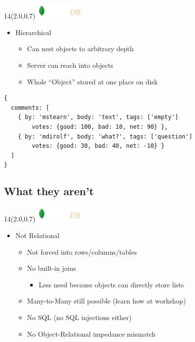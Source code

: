 \documentclass{beamer}
\newcommand{\MongoLogo}{
\begin{textblock}{14}(2.0,0.7)
  \includegraphics[height=0.8cm]{logo-mongodb-ondark.png}
\end{textblock}
}
\begin{document}
\begin{frame}[fragile]
  \MongoLogo
  \begin{itemize}
    \item Hierarchical 
    \begin{itemize}
      \item Can nest objects to arbitrary depth
      \item Server can reach into objects
      \item Whole ``Object'' stored at one place on disk
    \end{itemize}
  \end{itemize}

  \small
  \begin{lstlisting}
{
  comments: [
    { by: 'mstearn', body: 'text', tags: ['empty']
        votes: {good: 100, bad: 10, net: 90} },
    { by: 'mdirolf', body: 'what?', tags: ['question']
        votes: {good: 30, bad: 40, net: -10} }
  ]
}
  \end{lstlisting}
\end{frame}

\subsection{What they aren't}
\begin{frame}
  \MongoLogo

  \begin{itemize}
    \item Not Relational
    \begin{itemize}
      \item Not forced into rows/columns/tables
      \item No built-in joins
        \begin{itemize}
          \item Less need because objects can directly store lists
        \end{itemize}
      \item Many-to-Many still possible (learn how at workshop)
      \item No SQL (no SQL injections either)
      \item No Object-Relational impedance mismatch
    \end{itemize}
  \end{itemize}
\end{frame}
\end{document}
